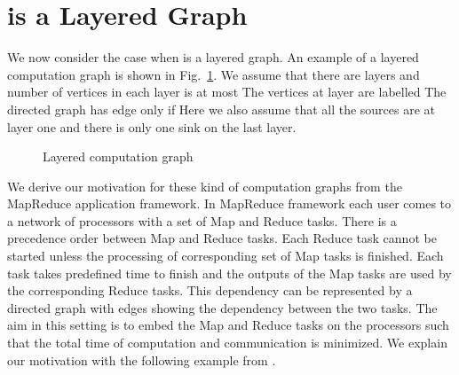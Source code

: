 \documentclass[journal]{IEEEtran}
\begin{document}
\section{ is a Layered Graph}
\label{sec:layered-graph}

We now consider the case when  is a layered graph.  An
example of a layered computation graph is shown in
Fig.~\ref{fig:layered}. We assume that there are  layers and number
of vertices in each layer is at most  The vertices at layer 
are labelled  The
directed graph has edge  only if  Here we also assume that all the sources are at
layer one and there is only one sink  on the last layer.
\begin{figure}[tbp]
  \centering
{}
  \caption{Layered computation graph}
  \label{fig:layered}
\end{figure}  


We derive our motivation for these kind of computation graphs from the
MapReduce application framework. In MapReduce framework each user
comes to a network of processors with a set of Map and Reduce
tasks. There is a precedence order between Map and Reduce tasks. Each
Reduce task cannot be started unless the processing of corresponding
set of Map tasks is finished. Each task takes predefined time to
finish and the outputs of the Map tasks are used by the corresponding
Reduce tasks. This dependency can be represented by a directed graph
with edges showing the dependency between the two tasks. The aim in
this setting is to embed the Map and Reduce tasks on the processors
such that the total time of computation and communication is
minimized. We explain our motivation with the following example from
\cite{Dean04}.
\end{document}
